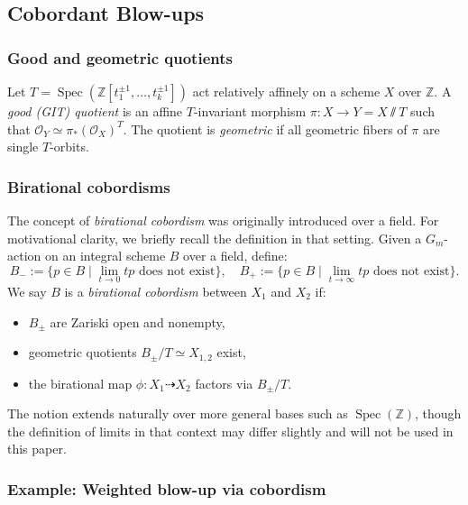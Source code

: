 \documentclass{amsart}
\newcommand{\ZZ}{{\mathbb{Z}}}
\newcommand{\cO}{{\mathcal O}}
\newcommand{\Spec}{\operatorname{Spec}}
\begin{document}
\subsection{Cobordant Blow-ups}

\subsubsection{Good and geometric quotients}

Let $T = \Spec(\ZZ[t_1^{\pm 1}, \ldots, t_k^{\pm 1}])$ act relatively affinely on a scheme $X$ over $\ZZ$. A \emph{good (GIT) quotient} is an affine $T$-invariant morphism $\pi: X \to Y = X \sslash T$ such that $\cO_Y \simeq \pi_*(\cO_X)^T$. The quotient is \emph{geometric} if all geometric fibers of $\pi$ are single $T$-orbits.

\subsubsection{Birational cobordisms}
\cite[Definition 2]{W-Cobordism}

The concept of {\it birational cobordism} was originally introduced over a field. For motivational clarity, we briefly recall the definition in that setting. Given a $G_m$-action on an integral scheme $B$ over a field, define:
\[
B_- := \{ p \in B \mid \lim_{t \to 0} tp \text{ does not exist} \}, \quad
B_+ := \{ p \in B \mid \lim_{t \to \infty} tp \text{ does not exist} \}.
\]
We say $B$ is a \emph{birational cobordism} between $X_1$ and $X_2$ if:
\begin{itemize}
  \item $B_\pm$ are Zariski open and nonempty,
  \item geometric quotients $B_\pm / T \simeq X_{1,2}$ exist,
  \item the birational map $\phi: X_1 \dashrightarrow X_2$ factors via $B_\pm / T$.
\end{itemize}

The notion extends naturally over more general bases such as $\Spec(\ZZ)$, though the definition of limits in that context may differ slightly and will not be used in this paper.
\subsubsection{Example: Weighted blow-up via cobordism}
\end{document}
